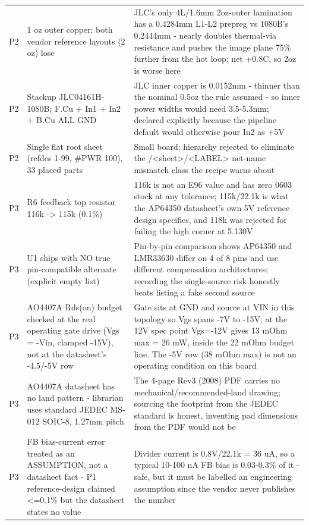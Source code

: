 \documentclass[11pt,a4paper]{article}
\begin{document}
{\begin{longtable}{lp{5.2cm}p{7.2cm}}
P2 & 1 oz outer copper; both vendor reference layouts (2 oz) lose & JLC's only 4L/1.6mm 2oz-outer lamination has a 0.4284mm L1-L2 prepreg vs 1080B's 0.2444mm - nearly doubles thermal-via resistance and pushes the image plane 75\% further from the hot loop; net +0.8C, so 2oz is worse here \\
P2 & Stackup JLC04161H-1080B; F.Cu + In1 + In2 + B.Cu ALL GND & JLC inner copper is 0.0152mm - thinner than the nominal 0.5oz the rule assumed - so inner power widths would need 3.5-5.3mm; declared explicitly because the pipeline default would otherwise pour In2 as +5V \\
P2 & Single flat root sheet (refdes 1-99, \#PWR 100), 33 placed parts & Small board; hierarchy rejected to eliminate the /\textless{}sheet\textgreater{}/\textless{}LABEL\textgreater{} net-name mismatch class the recipe warns about \\
P3 & R6 feedback top resistor 116k -\textgreater{} 115k (0.1\%) & 116k is not an E96 value and has zero 0603 stock at any tolerance; 115k/22.1k is what the AP64350 datasheet's own 5V reference design specifies, and 118k was rejected for failing the high corner at 5.130V \\
P3 & U1 ships with NO true pin-compatible alternate (explicit empty list) & Pin-by-pin comparison shows AP64350 and LMR33630 differ on 4 of 8 pins and use different compensation architectures; recording the single-source risk honestly beats listing a fake second source \\
P3 & AO4407A Rds(on) budget checked at the real operating gate drive (Vgs = -Vin, clamped -15V), not at the datasheet's -4.5/-5V row & Gate sits at GND and source at VIN in this topology so Vgs spans -7V to -15V; at the 12V spec point Vgs=-12V gives 13 mOhm max = 26 mW, inside the 22 mOhm budget line. The -5V row (38 mOhm max) is not an operating condition on this board \\
P3 & AO4407A datasheet has no land pattern - librarian uses standard JEDEC MS-012 SOIC-8, 1.27mm pitch & The 4-page Rev3 (2008) PDF carries no mechanical/recommended-land drawing; sourcing the footprint from the JEDEC standard is honest, inventing pad dimensions from the PDF would not be \\
P3 & FB bias-current error treated as an ASSUMPTION, not a datasheet fact - P1 reference-design claimed \textless{}=0.1\% but the datasheet states no value & Divider current is 0.8V/22.1k = 36 uA, so a typical 10-100 nA FB bias is 0.03-0.3\% of it - safe, but it must be labelled an engineering assumption since the vendor never publishes the number \\

\end{longtable}}
\end{document}
